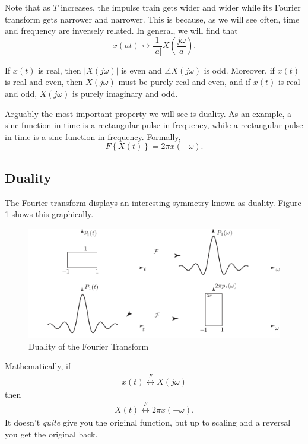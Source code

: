 Note that as $T$ increases, the impulse train gets wider
and wider while its Fourier transform gets narrower and
narrower. This is because, as we will see often, time and
frequency are inversely related. In general, we will find
that
\begin{equation}
    x(at) \leftrightarrow \frac{1}{|a|}X(\frac{j\omega}{a}).
\end{equation}

If $x(t)$ is real, then $|X(j\omega)|$ is even and
$\angle X(j\omega)$ is odd. Moreover, if $x(t)$ is real
and even, then $X(j\omega)$ must be purely real and even,
and if $x(t)$ is real and odd, $X(j\omega)$ is purely
imaginary and odd.

Arguably the most important property we will see is duality.
As an example, a sinc function in time is a rectangular pulse
in frequency, while a rectangular pulse in time is a sinc
function in frequency. Formally,
\begin{equation}
    F\left\{ X(t) \right\} = 2\pi x(-\omega).
\end{equation}

\subsection{Duality}

The Fourier transform displays an interesting symmetry known as duality.
Figure \ref{fig:duality} shows this graphically.
\begin{figure}
    \begin{center}
        \includegraphics{images/duality.png}
    \end{center}
    \caption{Duality of the Fourier Transform}
    \label{fig:duality}
\end{figure}
Mathematically, if
\begin{align}
    x(t) \overset{F}{\leftrightarrow} X(j\omega)
\end{align}
then
\begin{align}
    X(t) \overset{F}{\leftrightarrow} 2\pi x(-\omega).
\end{align}
It doesn't \emph{quite} give you the original function,
but up to scaling and a reversal you get the original back.

